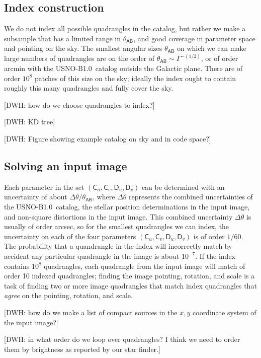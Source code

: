 \documentclass[12pt,preprint]{aastex}
\newcommand{\usnob}{USNO-B1.0}
\newcommand{\starlabel}[1]{\mathsf{#1}}
\newcommand{\AAA}{\starlabel{A}}
\newcommand{\BBB}{\starlabel{B}}
\newcommand{\CCC}{\starlabel{C}}
\newcommand{\DDD}{\starlabel{D}}
\newcommand{\thetaAB}{\theta_{\AAA\BBB}}
\begin{document}
\subsection{Index construction}

We do not index all possible quadrangles in the catalog, but rather we
make a subsample that has a limited range in $\thetaAB$, and good
coverage in parameter space and pointing on the sky.  The smallest
angular sizes $\thetaAB$ on which we can make large numbers of
quadrangles are on the order of $\thetaAB\sim\Gamma^{-(1/2)}$, or of
order arcmin with the \usnob\ catalog outside the Galactic plane.
There are of order $10^8$ patches of this size on the sky; ideally the
index ought to contain roughly this many quadrangles and fully cover
the sky.

[DWH: how do we choose quadrangles to index?]

[DWH: KD tree]

[DWH: Figure showing example catalog on sky and in code space?]

\subsection{Solving an input image}

Each parameter in the set $(\CCC_u,\CCC_v,\DDD_u,\DDD_v)$ can be
determined with an uncertainty of about $\Delta\theta/\thetaAB$, where
$\Delta\theta$ represents the combined uncertainties of the \usnob\
catalog, the stellar position determinations in the input image, and
non-square distortions in the input image.  This combined uncertainty
$\Delta\theta$ is usually of order arcsec, so for the smallest
quadrangles we can index, the uncertainty on each of the four
parameters $(\CCC_u,\CCC_v,\DDD_u,\DDD_v)$ is of order $1/60$.  The
probability that a quandrangle in the index will incorrectly match by
accident any particular quadrangle in the image is about $10^{-7}$.
If the index contains $10^8$ quadrangles, each quadrangle from the
input image will match of order 10 indexed quadrangles; finding the
image pointing, rotation, and scale is a task of finding two or more
image quadrangles that match index quadrangles that \emph{agree} on
the pointing, rotation, and scale.

[DWH: how do we make a list of compact sources in the $x,y$ coordinate
  system of the input image?]

[DWH: in what order do we loop over quadrangles?  I think we need to
  order them by brightness as reported by our star finder.]
\end{document}
